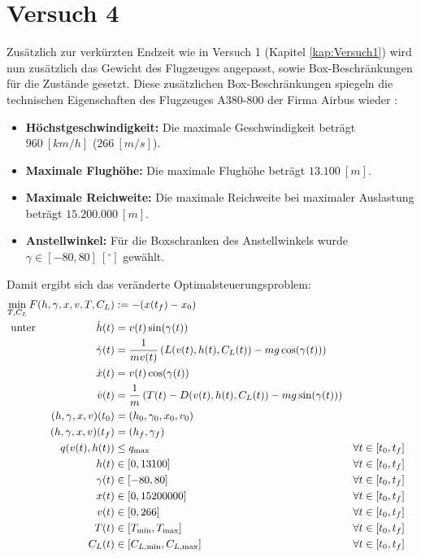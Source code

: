 \section{Versuch 4}
Zusätzlich zur verkürzten Endzeit wie in Versuch 1 (Kapitel \ref{kap:Versuch1}) wird nun zusätzlich das Gewicht des Flugzeuges angepasst, sowie Box-Beschränkungen für die Zustände gesetzt. Diese zusätzlichen Box-Beschränkungen spiegeln die technischen Eigenschaften des Flugzeuges A380-800 der Firma Airbus wieder \cite{A380Tech}:
\begin{itemize}
\item \textbf{Höchstgeschwindigkeit:} Die maximale Geschwindigkeit beträgt $960 \ [km/h]$ ($266 \ [m/s]$).
%
\item \textbf{Maximale Flughöhe:} Die maximale Flughöhe beträgt $13.100 \ [m]$.
%
\item \textbf{Maximale Reichweite:} Die maximale Reichweite bei maximaler Auslastung beträgt $15.200.000 \ [m]$.
%
\item \textbf{Anstellwinkel:} Für die Boxschranken des Anstellwinkels wurde $\gamma \in [-80,80] \ [^{\circ}]$ gewählt. 
\end{itemize}
Damit ergibt sich das veränderte Optimalsteuerungsproblem:
\begin{align*}
\min_{T, C_L} F(h,\gamma,x,v,T,C_L) &:= -(x(t_f) - x_0) \\
\text{unter} \hspace{20mm} \dot{h}(t) &= v(t) \sin(\gamma(t)) \\
\dot{\gamma}(t) &=  \dfrac{1}{mv(t)} \left( L(v(t),h(t),C_L(t)) - mg \cos(\gamma(t)) \right) \\
\dot{x}(t) &= v(t) \cos(\gamma(t))\\
\dot{v}(t) &= \dfrac{1}{m} \left( T(t) - D(v(t),h(t),C_L(t)) - mg \sin(\gamma(t)) \right) \\
(h,\gamma,x,v)(t_0) &= (h_0,\gamma_0,x_0,v_0) \\
(h,\gamma,x,v)(t_f) &= (h_f,\gamma_f) \hspace{36mm} \\
q(v(t),h(t)) &\leq q_{\max} & & \forall t \in [t_0,t_f] \\
h(t) &\in [0,13100] & & \forall t \in [t_0,t_f] \\
\gamma(t) &\in [-80,80] & & \forall t \in [t_0,t_f] \\
x(t) &\in [0,15200000] & & \forall t \in [t_0,t_f] \\
v(t) &\in [0,266] & & \forall t \in [t_0,t_f] \\
T(t) &\in [T_{\min},T_{\max}] & & \forall t \in [t_0,t_f] \\
C_L(t) &\in [C_{L, \min},C_{L, \max}] & & \forall t \in [t_0,t_f]
\end{align*}

